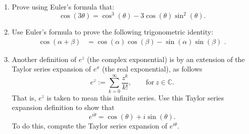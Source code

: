 \begin{enumerate}
\item Prove using Euler's formula that:
\begin{equation*}
    \cos(3\theta)= \cos^3(\theta)-3\cos(\theta)\sin^2(\theta).
\end{equation*}

\item Use Euler's formula to prove the following trigonometric identity:
\begin{align*}
\cos(\alpha + \beta)&=\cos(\alpha)\cos(\beta) - \sin(\alpha)\sin(\beta)\,\,.
\end{align*}

\item Another definition of $e^{z}$ (the complex exponential) is by an extension of the Taylor series expansion of $e^{x}$ (the real exponential), as follows
$$e^{z}:=\sum_{k=0}^{\infty}\frac{z^{k}}{k!}, \quad\quad \text{for}\ z\in\mathbb{C}.$$
That is, $e^{z}$ is taken to mean this infinite series. Use this Taylor series expansion definition to show that
\begin{equation}
  e^{i\theta} = \cos(\theta) + i\sin(\theta).
  \label{ch03:euler_formula}
\end{equation}
To do this, compute the Taylor series expansion of $e^{i\theta}$. 

\end{enumerate}